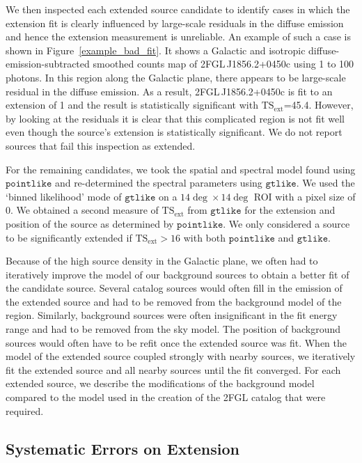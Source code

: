 \documentclass[12pt,preprint]{aastex}
\newcommand{\gev}{\text{GeV}\xspace}
\newcommand{\tsext}{{\ensuremath{\text{TS}_{\text{ext}}}}\xspace}
\newcommand{\gtlike}{\ensuremath{\mathtt{gtlike}}\xspace}
\newcommand{\pointlike}{\ensuremath{\mathtt{pointlike}}\xspace}
\begin{document}
We then inspected each extended source candidate to identify cases in
which the extension fit is clearly influenced by large-scale residuals in
the diffuse emission and hence the extension measurement is unreliable.
An example of such a case is shown in Figure~\ref{example_bad_fit}. It
shows a Galactic and isotropic diffuse-emission-subtracted smoothed
counts map of 2FGL\,J1856.2+0450c using 1 \gev to 100 \gev photons.
In this region along the Galactic plane, there appears to be large-scale
residual in the diffuse emission. As a result, 2FGL\,J1856.2+0450c is fit
to an extension of 1 and the result is statistically significant
with \tsext=45.4. However, by looking at the residuals it is clear
that this complicated region is not fit well even though the source's
extension is statistically significant. We do not report sources that
fail this inspection as extended.

For the remaining candidates, we took the spatial and spectral model found
using \pointlike and re-determined the spectral parameters using \gtlike.
We used the `binned likelihood' mode of \gtlike on a $14\deg\times14\deg$
ROI with a pixel size of 0.  We obtained a second measure of \tsext
from \gtlike for the extension and position of the source as determined
by \pointlike.  We only considered a source to be significantly extended
if $\tsext>16$ with both \pointlike and \gtlike.

Because of the high source density in the Galactic plane, we often had
to iteratively improve the model of our background sources to obtain a
better fit of the candidate source.  Several catalog sources would often
fill in the emission of the extended source and had to be removed from
the background model of the region.  Similarly, background sources were
often insignificant in the fit energy range and had to be removed from
the sky model.  The position of background sources would often have
to be refit once the extended source was fit.  When the model of the
extended source coupled strongly with nearby sources, we iteratively
fit the extended source and all nearby sources until the fit converged.
For each extended source, we describe the modifications of the background
model compared to the model used in the creation of the 2FGL catalog
that were required.

\subsection{Systematic Errors on Extension}
\label{systematic_errors_on_extension}
\end{document}
